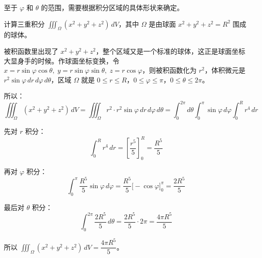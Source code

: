 至于 \(\varphi\) 和 \(\theta\) 的范围，需要根据积分区域的具体形状来确定。

\begin{myexample}
计算三重积分 \(\iiint_{\Omega} (x^2+y^2+z^2)\,dV\)，其中 \(\Omega\) 是由球面 \(x^2+y^2+z^2=R^2\) 围成的球体。

被积函数里出现了 \(x^2+y^2+z^2\)，整个区域又是一个标准的球体，这正是球面坐标大显身手的时候。作球面坐标变换，令 \(x=r\sin\varphi\cos\theta,\; y=r\sin\varphi\sin\theta,\; z=r\cos\varphi\)，则被积函数化为 \(r^2\)，体积微元是 \(r^2\sin\varphi\,dr\,d\varphi\,d\theta\)，区域 \(\Omega\) 就是 \(0\le r\le R\)，\(0\le\varphi\le\pi\)，\(0\le\theta\le 2\pi\)。

\begin{center}
\end{center}

所以：
\[
\iiint_{\Omega} (x^2+y^2+z^2)\,dV
= \iiint_{\Omega} r^2\cdot r^2\sin\varphi\,dr\,d\varphi\,d\theta
= \int_{0}^{2\pi} d\theta \int_{0}^{\pi}\sin\varphi \,d\varphi \int_{0}^{R} r^4\,dr
\]

先对 \(r\) 积分：
\[
\int_{0}^{R} r^4\,dr = \left[ \frac{r^5}{5} \right]_{0}^{R} = \frac{R^5}{5}
\]

再对 \(\varphi\) 积分：
\[
\int_{0}^{\pi} \frac{R^5}{5}\sin\varphi\,d\varphi = \frac{R^5}{5}\bigl[-\cos\varphi\bigr]_{0}^{\pi} = \frac{2R^5}{5}
\]

最后对 \(\theta\) 积分：
\[
\int_{0}^{2\pi}\frac{2R^5}{5}\,d\theta =\frac{2R^5}{5}\cdot 2\pi=\frac{4\pi R^5}{5}
\]

所以 \(\iiint_{\Omega} (x^2+y^2+z^2)\,dV = \dfrac{4\pi R^5}{5}\)。
\end{myexample}

